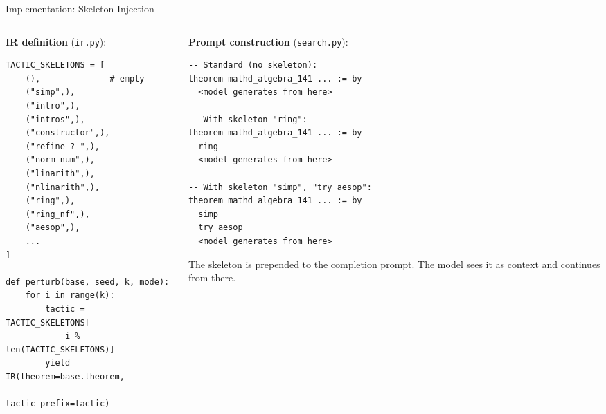 \documentclass[aspectratio=169]{beamer}
\begin{document}
\begin{frame}[fragile]{Implementation: Skeleton Injection}

\begin{columns}
\begin{column}{0.48\textwidth}
\textbf{IR definition} (\texttt{ir.py}):
\begin{lstlisting}[style=python]
TACTIC_SKELETONS = [
    (),              # empty
    ("simp",),
    ("intro",),
    ("intros",),
    ("constructor",),
    ("refine ?_",),
    ("norm_num",),
    ("linarith",),
    ("nlinarith",),
    ("ring",),
    ("ring_nf",),
    ("aesop",),
    ...
]

def perturb(base, seed, k, mode):
    for i in range(k):
        tactic = TACTIC_SKELETONS[
            i % len(TACTIC_SKELETONS)]
        yield IR(theorem=base.theorem,
                 tactic_prefix=tactic)
\end{lstlisting}
\end{column}
\begin{column}{0.48\textwidth}
\textbf{Prompt construction} (\texttt{search.py}):
\begin{lstlisting}[style=lean]
-- Standard (no skeleton):
theorem mathd_algebra_141 ... := by
  <model generates from here>

-- With skeleton "ring":
theorem mathd_algebra_141 ... := by
  ring
  <model generates from here>

-- With skeleton "simp", "try aesop":
theorem mathd_algebra_141 ... := by
  simp
  try aesop
  <model generates from here>
\end{lstlisting}

\vspace{0.3em}
{\small The skeleton is prepended to the completion prompt. The model sees it as context and continues from there.}
\end{column}
\end{columns}
\end{frame}
\end{document}
